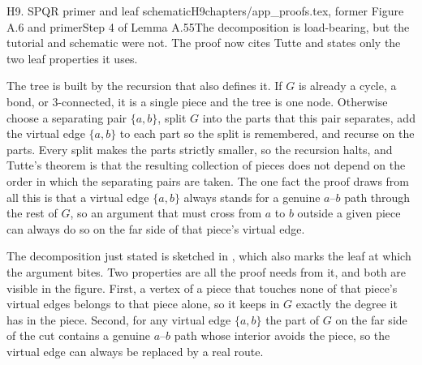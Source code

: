 \begin{offcutrewrite}{H9. SPQR primer and leaf schematic}{H9}{chapters/app\_proofs.tex, former Figure A.6 and primer}{Step 4 of Lemma A.55}{The decomposition is load-bearing, but the tutorial and schematic were not. The proof now cites Tutte and states only the two leaf properties it uses.}
\begin{primer}
The tree is built by the recursion that also defines it. If $G$ is already a
cycle, a bond, or $3$-connected, it is a single piece and the tree is one node.
Otherwise choose a separating pair $\{a, b\}$, split $G$ into the parts that this
pair separates, add the virtual edge $\{a, b\}$ to each part so the split is
remembered, and recurse on the parts. Every split makes the parts strictly
smaller, so the recursion halts, and Tutte's theorem is that the resulting
collection of pieces does not depend on the order in which the separating pairs
are taken. The one fact the proof draws from all this is that a virtual edge
$\{a, b\}$ always stands for a genuine $a$--$b$ path through the rest of $G$, so an
argument that must cross from $a$ to $b$ outside a given piece can always do so on
the far side of that piece's virtual edge.
\end{primer}

The decomposition just stated is sketched in , which also
marks the leaf at which the argument bites. Two properties are all the proof needs
from it, and both are visible in the figure. First, a vertex of a piece
that touches none of that piece's virtual edges belongs to that piece alone,
so it keeps in $G$ exactly the degree it has in the piece. Second, for any
virtual edge $\{a, b\}$ the part of $G$ on the far side of the cut contains a
genuine $a$--$b$ path whose interior avoids the piece, so the virtual edge
can always be replaced by a real route.


\end{offcutrewrite}
